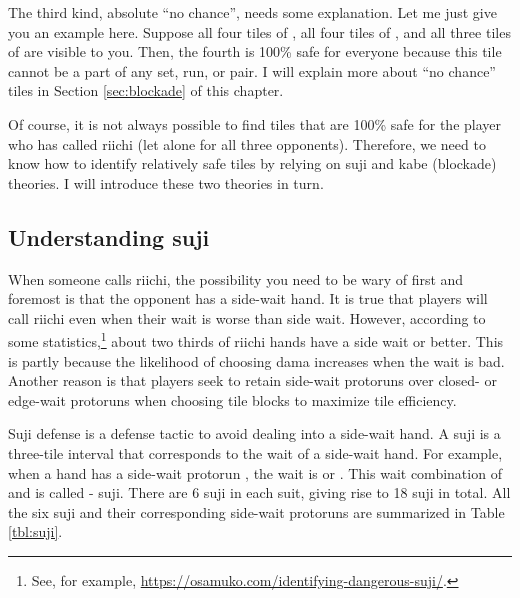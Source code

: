 \bigskip
The third kind, absolute ``no chance'', needs some explanation. Let me just give you an example here. Suppose all four tiles of {\LARGE {}}, all four tiles of {\LARGE {}}, and all three tiles of {\LARGE {}} are visible to you. Then, the fourth {\LARGE {}} is 100\% safe for everyone because this tile cannot be a part of any set, run, or pair. I will explain more about ``no chance'' tiles in Section \ref{sec:blockade} of this chapter.

\bigskip
Of course, it is not always possible to find tiles that are 100\% safe for the player who has called riichi (let alone for all three opponents). Therefore, we need to know how to identify relatively safe tiles by relying on {\jap suji} and {\jap kabe} (blockade) theories. I will introduce these two theories in turn.

\subsection{Understanding {\jap suji}}  \label{sec:suji}

When someone calls riichi, the possibility you need to be wary of first and foremost is that the opponent has a side-wait hand. 
It is true that players will call riichi even when their wait is worse than side wait. However, according to some statistics,\footnote{See, for example, \url{https://osamuko.com/identifying-dangerous-suji/}.} about two thirds of riichi hands have a side wait or better. This is partly because the likelihood of choosing {\jap dama} increases when the wait is bad. Another reason is that players seek to retain side-wait protoruns over closed- or edge-wait protoruns when choosing tile blocks to maximize tile efficiency.

\bigskip
{\jap Suji} defense is a defense tactic to avoid dealing into a side-wait hand. A {\jap suji} is a three-tile interval that corresponds to the wait of a side-wait hand. For example, when a hand has a side-wait protorun {\LARGE {}}, the wait is {\LARGE {}} or {\LARGE {}}. This wait combination of {\LARGE{}} and {\LARGE{}} is called {\LARGE{}-} {\jap suji}. There are 6 {\jap suji} in each suit, giving rise to 18 {\jap suji} in total. All the six {\jap suji} and their corresponding side-wait protoruns are summarized in Table \ref{tbl:suji}. 

